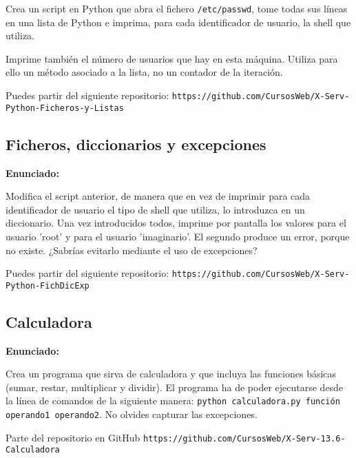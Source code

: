 Crea un script en Python que abra el fichero \verb|/etc/passwd|, tome todas sus líneas en una lista de Python e imprima, para cada identificador de usuario, la shell que utiliza.

Imprime también el número de usuarios que hay en esta máquina. Utiliza para
ello un método asociado a la lista, no un contador de la iteración.

Puedes partir del siguiente repositorio: \verb|https://github.com/CursosWeb/X-Serv-Python-Ficheros-y-Listas|

\subsection{Ficheros, diccionarios y excepciones}
\label{subsec:ficheros-dic-excep}

\textbf{Enunciado:}

Modifica el script
anterior, de manera que en vez de imprimir para cada identificador de usuario el tipo
de shell que utiliza, lo introduzca en un diccionario. Una vez introducidos todos, imprime por pantalla los valores para el usuario 'root' y para el
usuario 'imaginario'. El segundo produce un error, porque no existe. ¿Sabrías evitarlo mediante el uso de
excepciones?

Puedes partir del siguiente repositorio: \verb|https://github.com/CursosWeb/X-Serv-Python-FichDicExp|

\subsection{Calculadora}
\label{subsec:calculadora}

\textbf{Enunciado:}

Crea un programa que sirva de calculadora y que incluya las funciones
básicas (sumar, restar, multiplicar y dividir). El programa ha de poder ejecutarse desde la línea de comandos de la siguiente manera: \texttt{python calculadora.py
función operando1 operando2}. No olvides capturar las excepciones.

Parte del repositorio en GitHub \verb|https://github.com/CursosWeb/X-Serv-13.6-Calculadora|

\newpage

